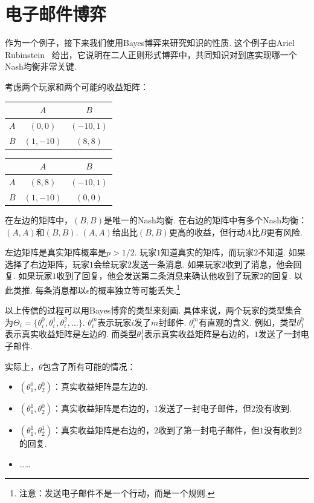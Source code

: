 \section{电子邮件博弈}\label{sec:emailing-game}

作为一个例子，接下来我们使用Bayes博弈来研究知识的性质. 这个例子由Ariel Rubinstein~\cite{rubinsteinElectronicMailGame1989} 给出，它说明在二人正则形式博弈中，共同知识对到底实现哪一个Nash均衡非常关键.

考虑两个玩家和两个可能的收益矩阵：
\begin{table}[ht]
    \centering
\begin{tabular}{c|cc}
&$A$ & $B$ \\
\hline
$A$ & $(0, 0)$ & $(-10, 1)$ \\
$B$ & $(1, -10)$ & $(8, 8)$ \\
\end{tabular}
\qquad
\begin{tabular}{c|cc}
&$A$ & $B$ \\
\hline
$A$ & $(8, 8)$ & $(-10, 1)$ \\
$B$ & $(1, -10)$ & $(0, 0)$ \\
\end{tabular}
\end{table}

在左边的矩阵中，$(B,B)$是唯一的Nash均衡. 在右边的矩阵中有多个Nash均衡：$(A,A)$和$(B,B)$. $(A,A)$给出比$(B,B)$更高的收益，但行动$A$比$B$更有风险.

左边矩阵是真实矩阵概率是$p>1/2$. 玩家$1$知道真实的矩阵，而玩家$2$不知道. 如果选择了右边矩阵，玩家$1$会给玩家$2$发送一条消息. 如果玩家$2$收到了消息，他会回复. 如果玩家$1$收到了回复，他会发送第二条消息来确认他收到了玩家$2$的回复. 以此类推.  每条消息都以$\epsilon$的概率独立等可能丢失.\footnote{注意：发送电子邮件不是一个行动，而是一个规则.}  

以上传信的过程可以用Bayes博弈的类型来刻画. 具体来说，两个玩家的类型集合为$\Theta_i = \{\theta_i^0, \theta_i^1, \theta_i^2, \dots\}$. $\theta_i^m$表示玩家$i$发了$m$封邮件. $\theta_i^m$有直观的含义. 例如，类型$\theta_1^0$表示真实收益矩阵是左边的.  而类型$\theta_1^1$表示真实收益矩阵是右边的，$1$发送了一封电子邮件. 

实际上，$\theta$包含了所有可能的情况：
\begin{itemize}
\item $(\theta_1^0, \theta_2^0)$：真实收益矩阵是左边的. 
\item $(\theta_1^1, \theta_2^0)$：真实收益矩阵是右边的，$1$发送了一封电子邮件，但$2$没有收到. 
\item $(\theta_1^1, \theta_2^1)$：真实收益矩阵是右边的，$2$收到了第一封电子邮件，但$1$没有收到$2$的回复. 
\item ……
\end{itemize}

